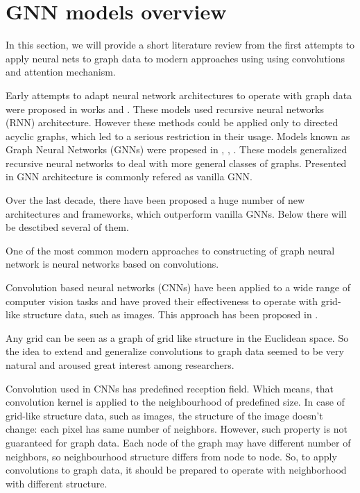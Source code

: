 \section{GNN models overview}
\label{sec:models}



In this section, we will provide a short literature review from the first attempts to
apply neural nets to graph data to modern approaches using using convolutions and attention mechanism.



Early attempts to adapt neural network architectures to operate with graph data 
were proposed in works \cite{FirstGNN1} and  \cite{FirstGNN2}. These models 
used recursive neural networks (RNN) architecture. However these methods could be applied
only to directed acyclic graphs, which led to a serious restriction in their usage.
Models known as Graph Neural Networks (GNNs) were propesed in  \cite{GNNlist1}, \cite{GNNlist2}, \cite{GNN}.
These models generalized recursive neural networks to deal with more general classes of graphs.
Presented in \cite{GNN} GNN architecture is commonly refered as vanilla GNN.


Over the last decade, there have been proposed a huge number of new architectures and frameworks, which 
outperform vanilla GNNs. Below there will be desctibed several of them. 



One of the most common modern approaches to constructing of graph neural network is
neural networks based on convolutions.

Convolution based neural networks (CNNs) have been applied to a wide range of computer
vision tasks and have proved their effectiveness to operate with grid-like structure data, such as images.
This approach has been proposed in \cite{CNN}.

Any grid can be seen as a graph of grid like structure in the Euclidean space. So the idea to extend and generalize
convolutions to graph data seemed to be very natural and aroused great interest among researchers.


Convolution used in CNNs has predefined reception field. Which means, that convolution kernel is 
applied to the neighbourhood of predefined size. In case of grid-like structure data, such as
images, the structure of the image doesn't change: each pixel has same number of neighbors. 
However, such property is not guaranteed for graph data. Each node of the graph may have 
different number of neighbors, so neighbourhood structure differs from node to node. So,
to apply convolutions to graph data, it should be prepared to operate with neighborhood 
with different structure.


